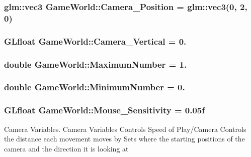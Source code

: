\subsubsection[{Camera\+\_\+\+Position}]{\setlength{\rightskip}{0pt plus 5cm}glm\+::vec3 Game\+World\+::\+Camera\+\_\+\+Position = glm\+::vec3(0, 2, 0)}\label{classGameWorld_ad80e597474ea4c52a583e81788187571}
\hypertarget{classGameWorld_a26658e739c4d267b1be35ed820089931}{}
\subsubsection[{Camera\+\_\+\+Vertical}]{\setlength{\rightskip}{0pt plus 5cm}G\+Lfloat Game\+World\+::\+Camera\+\_\+\+Vertical = 0.}\label{classGameWorld_a26658e739c4d267b1be35ed820089931}
\hypertarget{classGameWorld_a1cddcf233625a98581eaeb9fd7c8c574}{}
\subsubsection[{Maximum\+Number}]{\setlength{\rightskip}{0pt plus 5cm}double Game\+World\+::\+Maximum\+Number = 1.}\label{classGameWorld_a1cddcf233625a98581eaeb9fd7c8c574}
\hypertarget{classGameWorld_a54ccf4cf03172ab8779e9c326c8846ed}{}
\subsubsection[{Minimum\+Number}]{\setlength{\rightskip}{0pt plus 5cm}double Game\+World\+::\+Minimum\+Number = 0.}\label{classGameWorld_a54ccf4cf03172ab8779e9c326c8846ed}
\hypertarget{classGameWorld_a9bf4eb977e6ab9299aaef1345c4fa4dd}{}
\subsubsection[{Mouse\+\_\+\+Sensitivity}]{\setlength{\rightskip}{0pt plus 5cm}G\+Lfloat Game\+World\+::\+Mouse\+\_\+\+Sensitivity = 0.\+05f}\label{classGameWorld_a9bf4eb977e6ab9299aaef1345c4fa4dd}
Camera Variables. Camera Variables Controls Speed of Play/\+Camera Controls the distance each movement moves by Sets where the starting positions of the camera and the direction it is looking at \hypertarget{classGameWorld_a968eb29424b68f7cd79a5896c62e944d}{}

